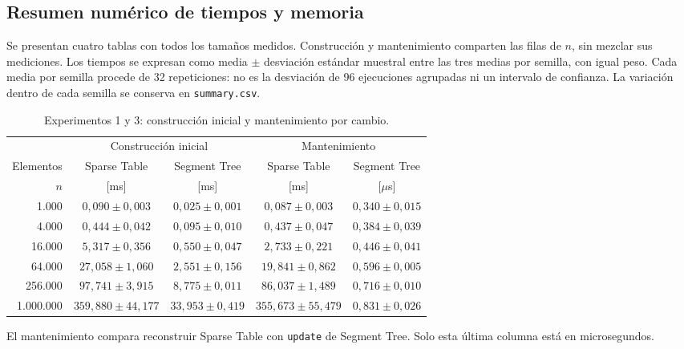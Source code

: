 \subsection{Resumen numérico de tiempos y memoria}

Se presentan cuatro tablas con todos los tamaños medidos. Construcción y
mantenimiento comparten las filas de \(n\), sin mezclar sus mediciones.
Los tiempos se expresan como media \(\pm\) desviación estándar muestral
entre las tres medias por semilla, con igual peso. Cada media por semilla
procede de 32 repeticiones: no es la desviación de 96 ejecuciones agrupadas
ni un intervalo de confianza. La variación dentro de cada semilla se
conserva en \texttt{summary.csv}.

\begingroup
\small
\setlength{\tabcolsep}{7pt}
\renewcommand{\arraystretch}{1.25}

\begin{table}[!ht]
    \centering
    \caption{Experimentos 1 y 3: construcción inicial y mantenimiento por cambio.}
    \label{tab:res-construccion}
    \label{tab:res-mantenimiento}
    \begin{tabular}{@{}rcccc@{}}
        \toprule
        & \multicolumn{2}{c}{Construcción inicial} & \multicolumn{2}{c}{Mantenimiento} \\
        \cmidrule(lr){2-3}\cmidrule(l){4-5}
        Elementos & Sparse Table & Segment Tree & Sparse Table & Segment Tree \\
        \(n\) & [ms] & [ms] & [ms] & [\(\mu\)s] \\
        \midrule
        1.000 & \(0{,}090 \pm 0{,}003\) & \(0{,}025 \pm 0{,}001\) & \(0{,}087 \pm 0{,}003\) & \(0{,}340 \pm 0{,}015\) \\
        4.000 & \(0{,}444 \pm 0{,}042\) & \(0{,}095 \pm 0{,}010\) & \(0{,}437 \pm 0{,}047\) & \(0{,}384 \pm 0{,}039\) \\
        16.000 & \(5{,}317 \pm 0{,}356\) & \(0{,}550 \pm 0{,}047\) & \(2{,}733 \pm 0{,}221\) & \(0{,}446 \pm 0{,}041\) \\
        64.000 & \(27{,}058 \pm 1{,}060\) & \(2{,}551 \pm 0{,}156\) & \(19{,}841 \pm 0{,}862\) & \(0{,}596 \pm 0{,}005\) \\
        256.000 & \(97{,}741 \pm 3{,}915\) & \(8{,}775 \pm 0{,}011\) & \(86{,}037 \pm 1{,}489\) & \(0{,}716 \pm 0{,}010\) \\
        1.000.000 & \(359{,}880 \pm 44{,}177\) & \(33{,}953 \pm 0{,}419\) & \(355{,}673 \pm 55{,}479\) & \(0{,}831 \pm 0{,}026\) \\
        \bottomrule
    \end{tabular}
    \par\smallskip
    \begin{minipage}{\linewidth}
        \footnotesize
        El mantenimiento compara reconstruir Sparse Table con \texttt{update}
        de Segment Tree. Solo esta última columna está en microsegundos.
    \end{minipage}
\end{table}


